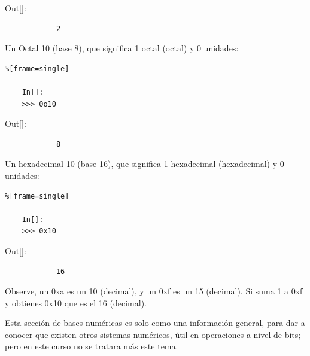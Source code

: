 {\ttfamily\scriptsize\scriptsize 
	\hspace{-0.65cm}Out[]:\vspace{-0.15cm}	
	{\color{blue} 	
		\begin{verbatim}
			2
		\end{verbatim}
}}

Un  Octal  10 (base 8), que significa 1 octal (octal) y 0 unidades:

\begin{lstlisting}%[frame=single]
	
	In[]:
	>>> 0o10	
\end{lstlisting}

{\ttfamily\scriptsize\scriptsize 
	\hspace{-0.65cm}Out[]:\vspace{-0.15cm}	
	{\color{blue} 	
		\begin{verbatim}
			8
		\end{verbatim}
}}

Un hexadecimal 10 (base 16), que significa 1 hexadecimal (hexadecimal) y 0 unidades:

\begin{lstlisting}%[frame=single]
	
	In[]:
	>>> 0x10	
\end{lstlisting}

{\ttfamily\scriptsize\scriptsize 
	\hspace{-0.65cm}Out[]:\vspace{-0.15cm}	
	{\color{blue} 	
		\begin{verbatim}
			16
		\end{verbatim}
}}


Observe, un {\ttfamily 0xa} es un 10 (decimal), y un {\ttfamily 0xf} es un  15 (decimal). Si suma 1 a {\ttfamily 0xf} y obtienes {\ttfamily 0x10} que es el 16 (decimal). 

Esta sección de bases numéricas es solo como una información general, para dar a conocer que existen otros sistemas numéricos,  útil en operaciones a nivel de bits; pero en este curso no se tratara más este tema. 








